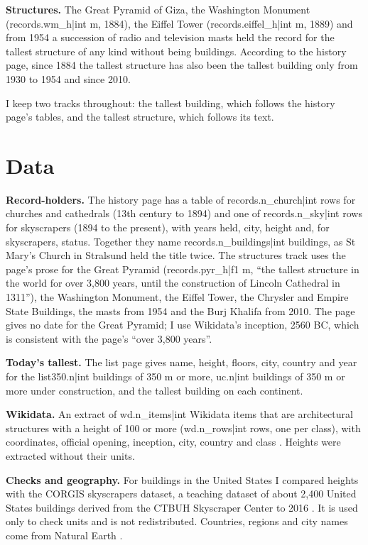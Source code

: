 \documentclass[11pt,a4paper]{article}
\begin{document}
\textbf{Structures.} The Great Pyramid of Giza, the Washington Monument ({{records.wm_h|int}} m, 1884), the Eiffel Tower ({{records.eiffel_h|int}} m, 1889) and from 1954 a succession of radio and television masts held the record for the tallest structure of any kind without being buildings. According to the history page, since 1884 the tallest structure has also been the tallest building only from 1930 to 1954 and since 2010.

I keep two tracks throughout: the tallest building, which follows the history page's tables, and the tallest structure, which follows its text.

\section{Data}
\textbf{Record-holders.} The history page \citep{wphist} has a table of {{records.n_church|int}} rows for churches and cathedrals (13th century to 1894) and one of {{records.n_sky|int}} rows for skyscrapers (1894 to the present), with years held, city, height and, for skyscrapers, status. Together they name {{records.n_buildings|int}} buildings, as St Mary's Church in Stralsund held the title twice. The structures track uses the page's prose for the Great Pyramid ({{records.pyr_h|f1}} m, ``the tallest structure in the world for over 3,800 years, until the construction of Lincoln Cathedral in 1311''), the Washington Monument, the Eiffel Tower, the Chrysler and Empire State Buildings, the masts from 1954 and the Burj Khalifa from 2010. The page gives no date for the Great Pyramid; I use Wikidata's inception, 2560 BC, which is consistent with the page's ``over 3,800 years''.

\textbf{Today's tallest.} The list page \citep{wplist} gives name, height, floors, city, country and year for the {{list350.n|int}} buildings of 350 m or more, {{uc.n|int}} buildings of 350 m or more under construction, and the tallest building on each continent.

\textbf{Wikidata.} An extract of {{wd.n_items|int}} Wikidata items that are architectural structures with a height of 100 or more ({{wd.n_rows|int}} rows, one per class), with coordinates, official opening, inception, city, country and class \citep{wikidata}. Heights were extracted without their units.

\textbf{Checks and geography.} For buildings in the United States I compared heights with the CORGIS skyscrapers dataset, a teaching dataset of about 2,400 United States buildings derived from the CTBUH Skyscraper Center to 2016 \citep{corgis}. It is used only to check units and is not redistributed. Countries, regions and city names come from Natural Earth \citep{naturalearth}.
\end{document}
